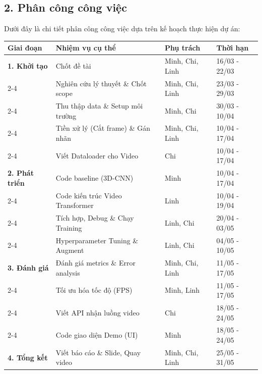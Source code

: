 \subsection*{2. Phân công công việc}
Dưới đây là chi tiết phân công công việc dựa trên kế hoạch thực hiện dự án:
\begin{table}[h]
\centering
{}
\begin{tabular}{|l|p{7.5cm}|l|l|}   
    \firsthline
    \textbf{Giai đoạn} & \textbf{Nhiệm vụ cụ thể} & \textbf{Phụ trách} & \textbf{Thời hạn} \\ \hline
    \textbf{1. Khởi tạo} & Chốt đề tài & Minh, Chi, Linh & 16/03 - 22/03 \\ \cline{2-4}
    & Nghiên cứu lý thuyết \& Chốt scope & Minh, Chi, Linh & 23/03 - 29/03 \\ \cline{2-4}
    & Thu thập data \& Setup môi trường & Minh, Chi & 30/03 - 10/04 \\ \cline{2-4}
    & Tiền xử lý (Cắt frame) \& Gán nhãn & Minh, Chi, Linh & 10/04 - 17/04 \\ \cline{2-4}
    & Viết Dataloader cho Video & Chi & 10/04 - 17/04 \\ \hline
    \textbf{2. Phát triển} & Code baseline (3D-CNN) & Minh & 10/04 - 17/04 \\ \cline{2-4}
    & Code kiến trúc Video Transformer & Linh & 10/04 - 19/04 \\ \cline{2-4}
    & Tích hợp, Debug \& Chạy Training & Linh, Chi & 20/04 - 03/05 \\ \cline{2-4}
    & Hyperparameter Tuning \& Augment & Linh, Chi & 04/05 - 10/05 \\ \hline
    \textbf{3. Đánh giá} & Đánh giá metrics \& Error analysis & Minh, Chi, Linh & 11/05 - 17/05 \\ \cline{2-4}
    & Tối ưu hóa tốc độ (FPS) & Minh, Linh & 11/05 - 17/05 \\ \cline{2-4}
    & Viết API nhận luồng video & Chi & 18/05 - 24/05 \\ \cline{2-4}
    & Code giao diện Demo (UI) & Minh & 18/05 - 24/05 \\ \hline
    \textbf{4. Tổng kết} & Viết báo cáo \& Slide, Quay video & Minh, Chi, Linh & 25/05 - 31/05 \\ \hline
\end{tabular}
\end{table}